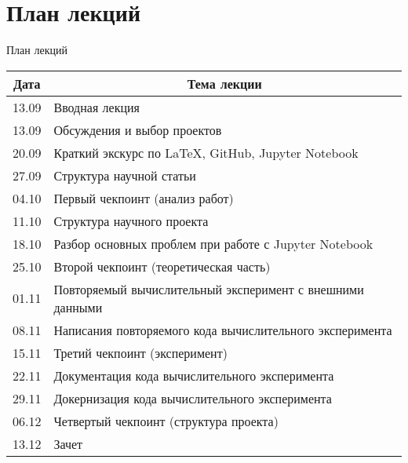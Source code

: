 \documentclass[10pt,pdf,hyperref={unicode}]{beamer}
\begin{document}
\section{План лекций}
\begin{frame}{План лекций}
\bigskip
\begin{table}[]
\begin{tabular}{|c|l|}
\hline
\textbf{Дата} & \multicolumn{1}{c|}{\textbf{Тема лекции}}                 \\ \hline
13.09         & Вводная лекция                                            \\ \hline
13.09         & Обсуждения и выбор проектов                               \\ \hline
20.09         & Краткий экскурс по LaTeX, GitHub, Jupyter Notebook        \\ \hline
27.09         & Структура научной статьи                                  \\ \hline
04.10         & Первый чекпоинт (анализ работ)                            \\ \hline
11.10         & Структура научного проекта                                \\ \hline
18.10         & Разбор основных проблем при работе с Jupyter Notebook     \\ \hline
25.10         & Второй чекпоинт (теоретическая часть)                     \\ \hline
01.11         & Повторяемый вычислительный эксперимент с внешними данными \\ \hline
08.11         & Написания повторяемого кода вычислительного эксперимента  \\ \hline
15.11         & Третий чекпоинт (эксперимент)                             \\ \hline
22.11         & Документация кода вычислительного эксперимента            \\ \hline
29.11         & Докернизация кода вычислительного эксперимента            \\ \hline
06.12         & Четвертый чекпоинт (структура проекта)                    \\ \hline
13.12         & Зачет                                                     \\ \hline
\end{tabular}
\end{table}
\end{frame}

\end{document}

